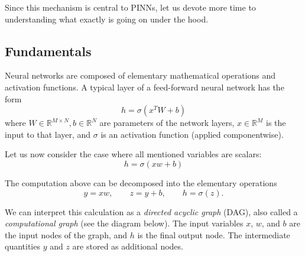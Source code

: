 Since this mechanism is central to PINNs, let us devote more time to understanding
what exactly is going on under the hood.

\subsection{Fundamentals}
Neural networks are composed of elementary %
mathematical operations and activation functions.
A typical layer of a feed-forward neural network has the form
$$
h = \sigma(x^T W + b)
$$
where $W\in\mathbb R^{M\times N},b\in\mathbb R^N$ are parameters of the network layers, $x\in\mathbb R^M$ is the input to that layer, 
and $\sigma$ is an activation function (applied componentwise).

Let us now consider the case where all mentioned variables are scalars:
$$
h = \sigma(x w + b)
$$


The computation above can be decomposed into the elementary operations
$$
y = xw,
\qquad
z = y + b,
\qquad
h = \sigma(z).
$$

We can interpret this calculation as a \emph{directed acyclic graph} (DAG),
also called a \emph{computational graph} (see the diagram below).
The input variables $x$, $w$, and $b$ are the input nodes of the graph,
and $h$ is the final output node.
The intermediate quantities $y$ and $z$ are stored as additional nodes.


